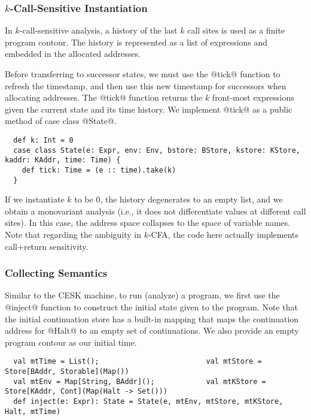 \documentclass[acmsmall, screen]{acmart}\settopmatter{}
\begin{document}
\subsubsection{$k$-Call-Sensitive Instantiation} \label{kcfainst}

In $k$-call-sensitive analysis, a history of the last $k$ call sites is used as a
finite program contour. The history is represented as a list of expressions and embedded
in the allocated addresses.

Before transferring to successor states, we must use the @tick@ function to refresh the
timestamp, and then use this new timestamp for successors when allocating addresses.
The @tick@ function returns the $k$ front-most expressions given the current state and its
time history. We implement @tick@ as a public method of case class @State@.

\begin{lstlisting}
  def k: Int = 0
  case class State(e: Expr, env: Env, bstore: BStore, kstore: KStore, kaddr: KAddr, time: Time) {
    def tick: Time = (e :: time).take(k)
  }
\end{lstlisting}

If we instantiate $k$ to be $0$, the history degenerates to an empty list, and we obtain
a monovariant analysis (i.e., it does not differentiate values at different call sites).
In this case, the address space collapses to the space of variable names.
Note that regarding the ambiguity in $k$-CFA\cite{Gilray:2016:ACP:2951913.2951936},
the code here actually implements call+return sensitivity.

\subsubsection{Collecting Semantics}

Similar to the CESK machine, to run (analyze) a program, we first use the @inject@ function
to construct the initial state given to the program. Note that the initial continuation store
has a built-in mapping that maps the continuation address for @Halt@ to an empty set of
continuations. We also provide an empty program contour as our initial time.

\begin{lstlisting}
  val mtTime = List();                         val mtStore = Store[BAddr, Storable](Map())
  val mtEnv = Map[String, BAddr]();            val mtKStore = Store[KAddr, Cont](Map(Halt -> Set()))
  def inject(e: Expr): State = State(e, mtEnv, mtStore, mtKStore, Halt, mtTime)
\end{lstlisting}
\end{document}
